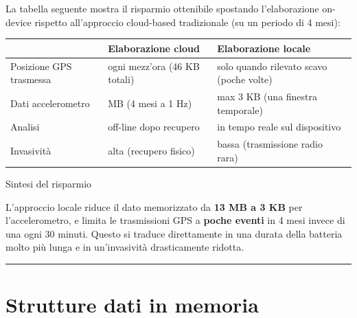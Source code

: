 \documentclass[
  italian,
  openany]{book}
\newcounter{none} %
\begin{document}
La tabella seguente mostra il risparmio ottenibile spostando
l'elaborazione on-device rispetto all'approccio cloud-based tradizionale
(su un periodo di 4 mesi):

{\def\LTcaptype{none} %
\begin{longtable}[]{@{}
  >{\raggedright\arraybackslash}p{}
  >{\raggedright\arraybackslash}p{}
  >{\raggedright\arraybackslash}p{}@{}}
\toprule\noalign{}
\begin{minipage}[b]{\linewidth}\raggedright
\end{minipage} & \begin{minipage}[b]{\linewidth}\raggedright
Elaborazione cloud
\end{minipage} & \begin{minipage}[b]{\linewidth}\raggedright
Elaborazione locale
\end{minipage} \\
\midrule\noalign{}
\endhead
\bottomrule\noalign{}
\endlastfoot
Posizione GPS trasmessa & ogni mezz'ora (46 KB totali) & solo quando
rilevato scavo (poche volte) \\
Dati accelerometro & 13 MB (4 mesi a 1 Hz) & max 3 KB (una finestra
temporale) \\
Analisi & off-line dopo recupero & in tempo reale sul dispositivo \\
Invasività & alta (recupero fisico) & bassa (trasmissione radio rara) \\
\end{longtable}
}

\begin{calloutnote}{Sintesi del risparmio}

L'approccio locale riduce il dato memorizzato da \textbf{13 MB a 3 KB}
per l'accelerometro, e limita le trasmissioni GPS a \textbf{poche
eventi} in 4 mesi invece di una ogni 30 minuti. Questo si traduce
direttamente in una durata della batteria molto più lunga e in
un'invasività drasticamente ridotta.

\end{calloutnote}

\begin{center}\rule{0.5\linewidth}{0.5pt}\end{center}

\section{Strutture dati in memoria}\label{strutture-dati-in-memoria}
\end{document}
